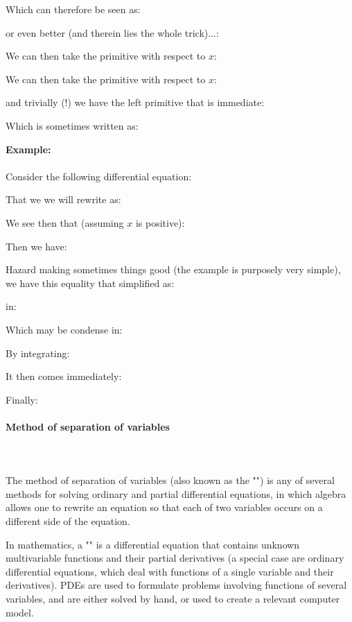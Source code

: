 	Which can therefore be seen as:
	
	or even better (and therein lies the whole trick)...:
	
	We can then take the primitive with respect to $x$:
	
	We can then take the primitive with respect to $x$:
	
	and trivially (!) we have the left primitive that is immediate:
	
	Which is sometimes written as:
	
	\begin{tcolorbox}[colframe=black,colback=white,sharp corners]
	\textbf{{\Large {}}Example:}\\\\
	Consider the following differential equation:
	
	That we we will rewrite as:
	
	We see then that (assuming $x$ is positive):
	
	Then we have:
	
	Hazard making  sometimes things good (the example is purposely very simple), we have this equality that simplified as:
	
	in:
	
	Which may be condense in:
	
	By integrating:
	
	It then comes immediately:
	
	Finally:
	
	\end{tcolorbox}
	
	\pagebreak
	\paragraph{Method of separation of variables}\label{separation vaiables method}\mbox{}\\\\
	The method of separation of variables (also known as the "") is any of several methods for solving ordinary and partial differential equations, in which algebra allows one to rewrite an equation so that each of two variables occurs on a different side of the equation.
	
	In mathematics, a "" is a differential equation that contains unknown multivariable functions and their partial derivatives (a special case are ordinary differential equations, which deal with functions of a single variable and their derivatives). PDEs are used to formulate problems involving functions of several variables, and are either solved by hand, or used to create a relevant computer model.
	
